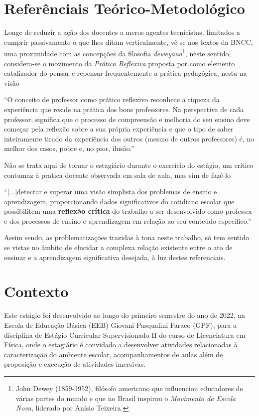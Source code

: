 \section{Referênciais Teórico-Metodológico}
Longe de reduzir a ação dos docentes a meros agentes tecnicistas, limitados a cumprir passivamente o que lhes ditam verticalmente, vê-se nos textos da BNCC, uma proximidade com as concepções da filosofia \emph{deweyana}\footnote{John Dewey (1859-1952), filósofo americano que influenciou educadores de várias partes do mundo e que no Brasil inspirou o \emph{Movimento da Escola Nova}, liderado por Anísio Teixeira.}, neste sentido, considera-se o movimento da \emph{Prática Reflexiva} proposta por \cite{ZEICHNER:1993} como elemento catalizador do pensar e repensar frequentemente a prática pedagógica, nesta na visão
\begin{citacao}
``O conceito de professor como prático reflexivo reconhece a riqueza da experiência que reside na prática dos bons professores. Na perspectiva de cada professor, significa que o processo de compreensão e melhoria do seu ensino deve começar pela reflexão sobre a sua própria experiência e que o tipo de saber inteiramente tirado da experiência dos outros (mesmo de outros professores) é, no melhor dos casos, pobre e, no pior, ilusão.'' 
\end{citacao}
Não se trata aqui de tornar o estagiário durante o exercício do estágio, um crítico contumaz à pratica docente observada em sala de aula, mas sim de fazê-lo 
\begin{citacao}
``[...]detectar e superar uma visão simplista dos problemas de ensino e aprendizagem, proporcionando dados significativos do cotidiano escolar que possibilitem uma \textbf{reflexão crítica} do trabalho a ser desenvolvido como professor e dos processos de ensino e aprendizagem em relação ao seu conteúdo específico.'' \cite[p. 11, \textbf{grifos meus}]{CARVALHOAMP:2012b} 
\end{citacao}
Assim sendo, as problematizações trazidas à tona neste trabalho, só tem sentido se vistas no âmbito de elucidar a complexa relação existente entre o ato de ensinar e a aprendizagem significativa desejada, à luz destes referenciais.

\section{Contexto}
Este estágio foi desenvolvido ao longo do primeiro semestre do ano de 2022, na Escola de Educação Básica (EEB) Giovani Pasqualini Faraco (GPF), para a disciplina de Estágio Curricular Supervisionado II do curso de Licenciatura em Física, onde o estagiário é convidado a desenvolver atividades relacionadas à caracterização do ambiente escolar, acompanhamentos de aulas além de proposição e execução de atividades imersivas.
 

